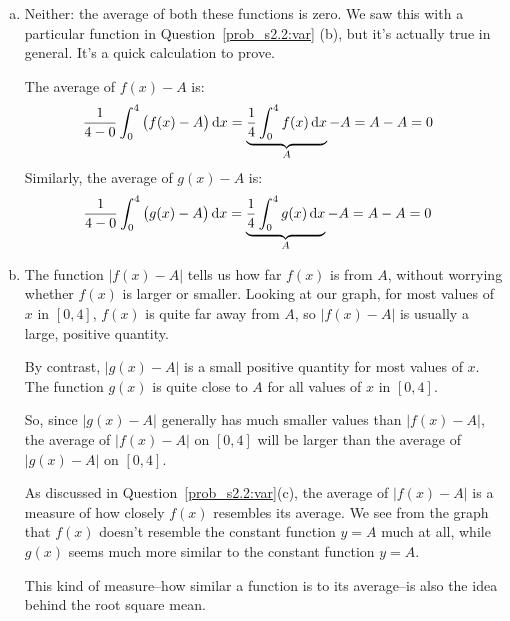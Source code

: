 \begin{solution}
\begin{enumerate}[(a)]
\item Neither: the average of both these functions is zero. We saw this with a particular function in Question~\ref{prob_s2.2:var} (b), but it's  actually true in general. It's a quick calculation to prove.

The average of $f(x)-A$ is:
\begin{align*}
\frac{1}{4-0}\int_0^4 \big(f(x)-A\big)\,\mathrm{d}x&=\underbrace{\frac{1}{4}\int_0^4f(x)\,\mathrm{d}x}_{A} - A=A-A=0
\end{align*}
Similarly, the average of $g(x)-A$ is:
\begin{align*}
\frac{1}{4-0}\int_0^4 \big(g(x)-A\big)\,\mathrm{d}x&=\underbrace{\frac{1}{4}\int_0^4g(x)\,\mathrm{d}x}_{A} - A=A-A=0
\end{align*}
\item The function $|f(x)-A|$ tells us how far $f(x)$ is from $A$, without worrying whether $f(x)$ is larger or smaller. Looking at our graph, for most values of $x$ in $[0,4]$, $f(x)$ is quite far away from $A$, so $|f(x)-A|$ is usually a large, positive quantity.

By contrast, $|g(x)-A|$ is a small positive quantity for most values of $x$. The function $g(x)$ is quite close to $A$ for all values of $x$ in $[0,4]$.

So, since $|g(x)-A|$ generally has much smaller values than $|f(x)-A|$, the average of $|f(x)-A|$ on $[0,4]$ will be larger than
the average of $|g(x)-A|$ on $[0,4]$.

As discussed in Question~\ref{prob_s2.2:var}(c), the average of $|f(x)-A|$ is a measure of how closely $f(x)$ resembles its average. We see from the graph that $f(x)$ doesn't resemble the constant function $y=A$ much at all, while $g(x)$ seems much more similar to the constant function $y=A$.

This kind of measure--how similar a function is to its average--is also the idea behind the root square mean.
\end{enumerate}
\end{solution}
